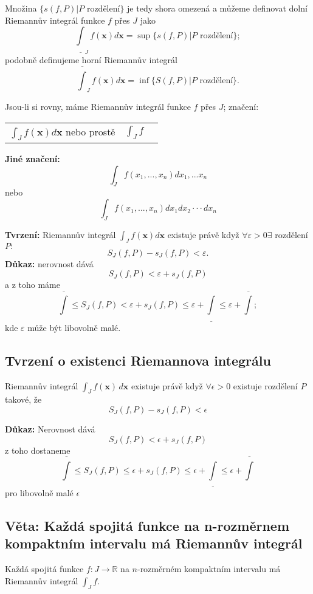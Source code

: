 \documentclass[../main.tex]{subfiles}
\begin{document}
Množina $\{s(f,P) | P \text{ rozdělení}\}$ je tedy shora omezená a můžeme definovat dolní Riemannův integrál funkce $f$ přes $J$ jako
\[\underline{\int}_J f(\textbf{x})d\textbf{x} = \sup\{s(f,P) | P \text{ rozdělení}\};\]
podobně definujeme horní Riemannův integrál
\[\overline{\int}_J f(\textbf{x})d\textbf{x} = \inf\{S(f,P) | P \text{ rozdělení}\}.\]

Jsou-li si rovny, máme Riemannův integrál funkce $f$ přes $J$; značení:
\begin{center}
\begin{tabular}{c c c}
    $\int_J f(\textbf{x})d\textbf{x}$ nebo prostě & $\int_J f $\\
\end{tabular}
\end{center}

\textbf{Jiné značení:}
\[\int_J f(x_1,...,x_n)dx_1,...x_n\]
nebo
\[\int_J f(x_1,...,x_n)dx_1 dx_2\cdot \cdot \cdot dx_n\]

\textbf{Tvrzení:} Riemannův integrál $\int_J f(\textbf{x})d\textbf{x}$ existuje právě když $\forall \varepsilon > 0 \exists$ rozdělení $P : $
\[S_J(f,P) - s_J(f,P) < \varepsilon.\]
\vspace{5mm}
\noindent
\textbf{Důkaz:} nerovnost dává
\[S_J(f,P) < \varepsilon + s_J(f,P)\]
a z toho máme
\[\overline{\int} \leq S_J(f,P) < \varepsilon + s_J(f,P) \leq \varepsilon + \underline{\int} \leq \varepsilon + \overline{\int};\]
kde $\varepsilon$ může být libovolně malé.
\subsection{Tvrzení o existenci Riemannova integrálu}
\hspace{1.2mm}
Riemannův integrál $\int_{J} f(\mathbf{x}) \,d\mathbf{x}$ existuje právě když
$\forall \epsilon > 0$ existuje rozdělení $P$ takové, že
\[ S_J(f,P) - s_J(f,P) < \epsilon \]

\vspace{5mm}
\noindent
\textbf{Důkaz:}
Nerovnost dává \[ S_J(f,P) < \epsilon + s_J(f,P) \]
z toho dostaneme
\[ \overline{\int} \leq S_J(f,P) \leq \epsilon + s_J(f,P) \leq \epsilon + \underline{\int} \leq
\epsilon + \overline{\int}\]
pro libovolně malé $\epsilon$

\subsection{Věta: Každá spojitá funkce na n-rozměrnem kompaktním intervalu má Riemannův integrál}
\hspace{1.2mm}
Každá spojitá funkce $f: J \to \mathbb{R}$ na $n$-rozměrném kompaktním intervalu má Riemannův integrál
$\int_{J}f$.
\end{document}
